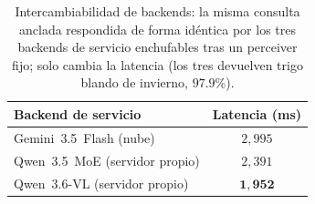 \begin{table}[htbp]
\caption{Intercambiabilidad de backends: la misma consulta anclada respondida de
forma idéntica por los tres backends de servicio enchufables tras un perceiver
fijo; solo cambia la latencia (los tres devuelven trigo blando de invierno,
$97.9\%$).}
\label{tab:backend-switch}
\centering
\begin{tabular}{lc}
\toprule
\textbf{Backend de servicio} & \textbf{Latencia (ms)} \\
\midrule
Gemini~3.5~Flash (nube)       & $2{,}995$ \\
Qwen~3.5~MoE (servidor propio) & $2{,}391$ \\
Qwen~3.6-VL (servidor propio)  & $\mathbf{1{,}952}$ \\
\bottomrule
\end{tabular}
\end{table}

